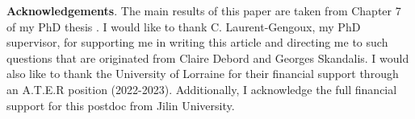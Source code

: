 \documentclass[10pt]{article}
\theoremstyle{plain}
\theoremstyle{definition}
\theoremstyle{remark}
\begin{document}
\noindent
\textbf{Acknowledgements}. The main results of this paper are taken from Chapter 7 of my PhD thesis \cite{LouisRuben2023UhLa}. I would like to thank C. Laurent-Gengoux, my PhD supervisor, for supporting me in writing this article and directing me to such questions that are originated from Claire Debord and Georges Skandalis. I would also like to thank the University of Lorraine for their financial support through an A.T.E.R position (2022-2023). Additionally, I acknowledge the full financial support for this postdoc from Jilin University.


\end{document}
